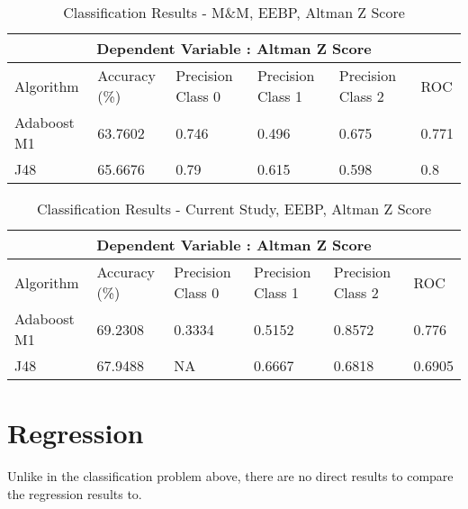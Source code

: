 \begin{table}[h!]
\centering
\begin{tabular}{ |p{2.5cm}||p{2.5cm}|p{2.5cm}|p{2.5cm}|p{2.5cm}|p{1.5cm}|  }
 \hline
 \multicolumn{6}{|c|}{Dependent Variable : Altman Z Score} \\
 \hline
 Algorithm & Accuracy (\%) & Precision Class 0 & Precision Class 1 & Precision Class 2 & ROC \\
 \hline
 Adaboost M1  &  63.7602     & 0.746 &  0.496 & 0.675 & 0.771  \\
 J48  & 65.6676  & 0.79 &  0.615 & 0.598 & 0.8  \\
 \hline
\end{tabular}
\caption{Classification Results  - M\&M, EEBP, Altman Z Score}
\end{table}


\begin{table}[h!]
\centering
\begin{tabular}{ |p{2.5cm}||p{2.5cm}|p{2.5cm}|p{2.5cm}|p{2.5cm}|p{1.5cm}|  }
 \hline
 \multicolumn{6}{|c|}{Dependent Variable : Altman Z Score} \\
 \hline
 Algorithm & Accuracy (\%) & Precision Class 0 & Precision Class 1 & Precision Class 2 & ROC \\
 \hline
 Adaboost M1  &  69.2308     & 0.3334 &  0.5152 & 0.8572 & 0.776  \\
 J48  & 67.9488  & NA &  0.6667 & 0.6818 & 0.6905  \\
 \hline
\end{tabular}
\caption{Classification Results  - Current Study, EEBP, Altman Z Score}
\end{table}


\section{Regression}\label{S.regression4}
{Unlike in the classification problem above, there are no direct results to compare the regression results to.}


